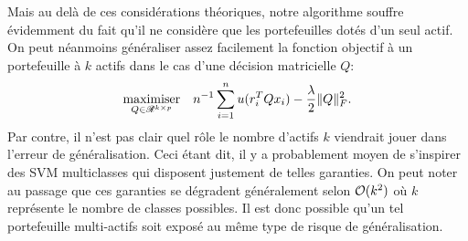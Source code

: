 Mais au delà de ces considérations théoriques, notre algorithme souffre évidemment du fait
qu'il ne considère que les portefeuilles dotés d'un seul actif. On peut néanmoins
généraliser assez facilement la fonction objectif à un portefeuille à $k$ actifs dans le
cas d'une décision matricielle $Q$:
\begin{equation}
  \maximizeEquation[Q \in \Re^{k \times p}]{n^{-1}\sumi u(r_i^TQ x_i) - \frac{\lambda}{2}\|Q\|^2_F.}
\end{equation}
Par contre, il n'est pas clair quel rôle le nombre d'actifs $k$ viendrait jouer dans
l'erreur de généralisation. Ceci étant dit, il y a probablement moyen de s'inspirer des
SVM multiclasses qui disposent justement de telles garanties. On peut noter au passage que
ces garanties se dégradent généralement selon $\bigO(k^2)$ où $k$ représente le nombre de
classes possibles. Il est donc possible qu'un tel portefeuille multi-actifs soit exposé au
même type de risque de généralisation. 



